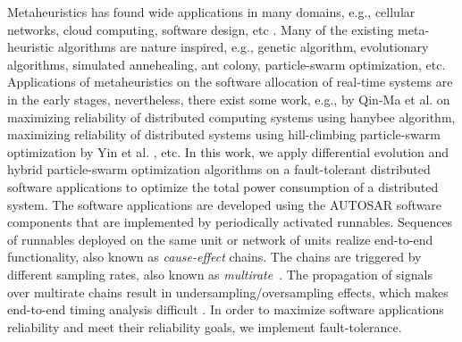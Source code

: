 Metaheuristics has found wide applications in many domains, e.g.,  cellular networks, cloud computing, software design, etc \cite{2006HandbookMetaheuristics}. Many of the existing meta-heuristic algorithms are nature inspired, e.g., genetic algorithm, evolutionary algorithms, simulated annehealing, ant colony, particle-swarm optimization, etc. Applications of metaheuristics on the software allocation of real-time systems are in the early stages, nevertheless, there exist some work, e.g., by Qin-Ma et al. \cite{kartik1997task} on maximizing reliability of distributed computing systems using hanybee algorithm, maximizing reliability of distributed systems using hill-climbing particle-swarm optimization by Yin et al. \cite{yin2007task}, etc. In this work, we apply differential evolution and hybrid particle-swarm optimization algorithms on a fault-tolerant distributed software applications to optimize the total power consumption of a distributed system. The software applications are developed using the AUTOSAR software components that are implemented by periodically activated runnables. Sequences of runnables deployed on the same unit or network of units realize end-to-end functionality, also known as \textit{cause-effect} chains. The chains are triggered by different sampling rates, also known as  \textit{multirate}~\cite{Vinet2010APolynomials}. The propagation of signals over multirate chains result in undersampling/oversampling effects, which makes end-to-end timing analysis difficult \cite{mubeen2013support}. In order to maximize software applications reliability and meet their reliability goals, we implement fault-tolerance. 

